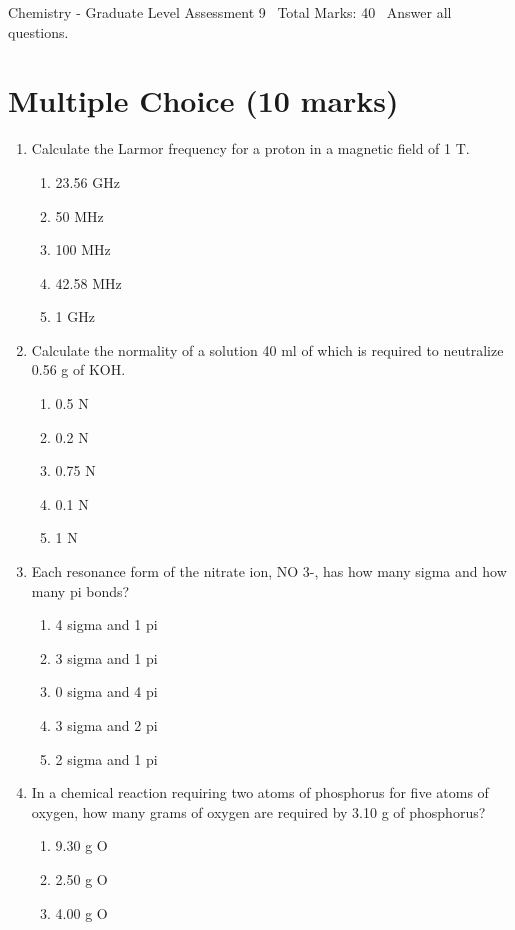 \documentclass[12pt]{article}
\begin{document}
\begin{center}
Chemistry - Graduate Level Assessment 9 \
Total Marks: 40 \
Answer all questions.
\end{center}

\section*{Multiple Choice (10 marks)}
\begin{enumerate}[label=\arabic*.]
\item Calculate the Larmor frequency for a proton in a magnetic field of 1 T.
\begin{enumerate}[label=(\alph*)]
    \item 23.56 GHz
    \item 50 MHz
    \item 100 MHz
    \item 42.58 MHz
    \item 1 GHz
\end{enumerate}
\item Calculate the normality of a solution 40 ml of which is required to neutralize 0.56 g of KOH.
\begin{enumerate}[label=(\alph*)]
    \item 0.5 N
    \item 0.2 N
    \item 0.75 N
    \item 0.1 N
    \item 1 N
\end{enumerate}
\item Each resonance form of the nitrate ion, NO 3-, has how many sigma and how many pi bonds?
\begin{enumerate}[label=(\alph*)]
    \item 4 sigma and 1 pi
    \item 3 sigma and 1 pi
    \item 0 sigma and 4 pi
    \item 3 sigma and 2 pi
    \item 2 sigma and 1 pi
\end{enumerate}
\item In a chemical reaction requiring two atoms of phosphorus for five atoms of oxygen, how many grams of oxygen are required by 3.10 g of phosphorus?
\begin{enumerate}[label=(\alph*)]
    \item 9.30 g O
    \item 2.50 g O
    \item 4.00 g O

\end{enumerate}
\end{enumerate}
\end{document}
